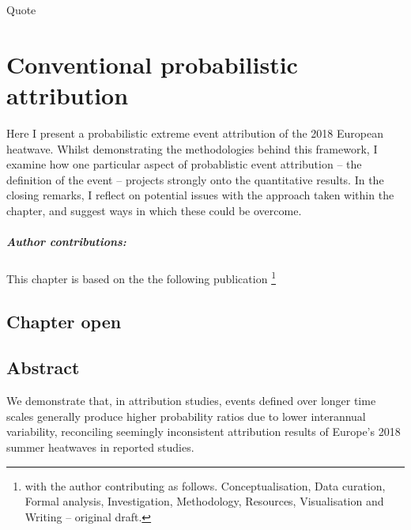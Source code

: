 \begin{savequote}[8cm]
    Quote
\end{savequote}
    
\chapter{\label{ch1}Conventional probabilistic attribution} 

Here I present a probabilistic extreme event attribution of the 2018 European heatwave. Whilst demonstrating the methodologies behind this framework, I examine how one particular aspect of probablistic event attribution -- the definition of the event -- projects strongly onto the quantitative results. In the closing remarks, I reflect on potential issues with the approach taken within the chapter, and suggest ways in which these could be overcome.
\small\paragraph{Author contributions:} This chapter is based on the the following publication \footnote{with the author contributing as follows. Conceptualisation, Data curation, Formal analysis, Investigation, Methodology, Resources, Visualisation and Writing -- original draft.} \par\vspace{1em}

\clearpage

\minitoc

\clearpage

\section{Chapter open}

\section{Abstract}

  We demonstrate that, in attribution studies, events defined over longer time scales generally produce higher probability ratios due to lower interannual variability, reconciling seemingly inconsistent attribution results of Europe's 2018 summer heatwaves in reported studies.

